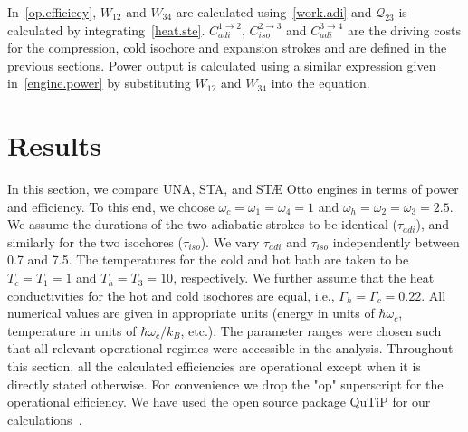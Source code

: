 \documentclass[aps,pra,twocolumn,showpacs,showkeys,groupedaddress,nobalancelastpage,nofootinbib,floatfix,superscriptaddress,longbibliography]{revtex4-2}
\begin{document}
In~\cref{op.efficiecy}, $W_{12}$ and $W_{34}$ are calculated using~\cref{work.adi} and $\mathcal{Q}_{23}$ is calculated by integrating~\cref{heat.ste}. $C_{adi}^{1\rightarrow 2}$, $C_{iso}^{2\rightarrow 3}$ and $C_{adi}^{3\rightarrow 4}$ are the driving costs for the compression, cold isochore and expansion strokes and are defined in the previous sections. Power output is calculated using a similar expression given in~\cref{engine.power} by substituting $W_{12}$ and $W_{34}$ into the equation.

\section{Results}
\label{sec:result}
In this section, we compare UNA, STA, and ST{{\AE}} Otto engines in terms of power and efficiency. To this end, we choose $\omega_c = \omega_1 = \omega_4 = 1$ and $\omega_h = \omega_2 = \omega_3 = 2.5$. We assume the durations of the two adiabatic strokes to be identical ($\tau_{adi}$), and similarly for the two isochores ($\tau_{iso}$). We vary $\tau_{adi}$ and $\tau_{iso}$ independently between 0.7 and 7.5. The temperatures for the cold and hot bath are taken to be $T_c=T_1=1$ and $T_h=T_3=10$, respectively. We further assume that the heat conductivities for the hot and cold isochores are equal, i.e.,  $\Gamma_h=\Gamma_c=0.22$. All numerical values are given in appropriate units (energy in units of $\hbar\omega_c$, temperature in units of $\hbar\omega_c/k_B$, etc.). The parameter ranges were chosen such that all relevant operational regimes were accessible in the analysis. Throughout this section, all the calculated efficiencies are operational except when it is directly stated otherwise. For convenience we drop the "op" superscript for the operational efficiency. We have used the open source package QuTiP for our calculations~\cite{qutip}.\\
\end{document}
